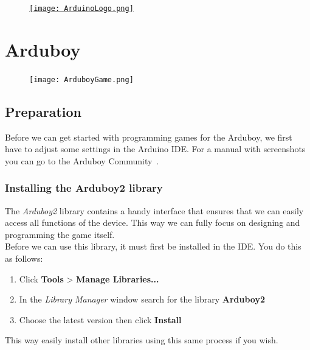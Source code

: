 \documentclass[11pt,fleqn]{book} %
\begin{document}
\begin{figure}[!h]
	\centering
	\href{https://www.arduino.cc/en/Main/Software}{
		\texttt{[image: ArduinoLogo.png]}
	}
\end{figure}

\chapter{Arduboy}
\begin{figure}[!h]
	\centering
	\texttt{[image: ArduboyGame.png]}
\end{figure}

\section{Preparation}
\label{sec:arduboy-instellingen}

Before we can get started with programming games for the Arduboy, we first have to adjust some settings in the Arduino IDE. For a manual with screenshots you can go to the Arduboy Community~\cite{arduboy:tuto1}.

\subsection{Installing the Arduboy2 library}
The \emph{Arduboy2} library contains a handy interface that ensures that we can easily access all functions of the device. This way we can fully focus on designing and programming the game itself.\\

\noindent
Before we can use this library, it must first be installed in the IDE. You do this as follows:\\

\begin{enumerate}
	\item Click \textbf{Tools} > \textbf{Manage Libraries...}
	\item In the \emph{Library Manager} window search for the library \textbf{Arduboy2}
	\item Choose the latest version then click \textbf{Install}
\end{enumerate}

This way easily install other libraries using this same process if you wish.
\end{document}
